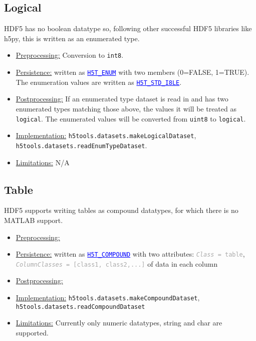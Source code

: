 \documentclass[11pt]{exam}
\newcommand\myurl[1]{\textcolor{blue}{\underline{#1}}}
\newcommand\myfcn[1]{\colorbox{codegray}{\textcolor{codeblue}{\texttt{#1}}}}
\newcommand\hdftype[1]{\texttt{\myurl{#1}}}
\newcommand\myatt[2]{\textcolor{darkgray}{\texttt{\textit{#1} = #2}}}
\begin{document}
		\subsection{Logical}
		\noindent HDF5 has no boolean datatype so, following other successful HDF5 libraries like h5py, this is written as an enumerated type.
		\begin{itemize}
			\item \underline{Preprocessing:} Conversion to \texttt{int8}.
			\item \underline{Persistence:} written as \myurl{\texttt{H5T\_ENUM}} with two members (0=FALSE, 1=TRUE). The enumeration values are written as \hdftype{H5T\_STD\_I8LE}.
			\item \underline{Postprocessing:} If an enumerated type dataset is read in and has two enumerated types matching those above, the values it will be treated as \texttt{logical}. The enumerated values will be converted from \texttt{uint8} to \texttt{logical}. 
			\item \underline{Implementation:} \myfcn{h5tools.datasets.makeLogicalDataset}, \myfcn{h5tools.datasets.readEnumTypeDataset}.
			\item \underline{Limitations:} N/A
		\end{itemize}
		
		\subsection{Table}
		\noindent HDF5 supports writing tables as compound datatypes, for which there is no MATLAB support.
		\begin{itemize}
			\item \underline{Preprocessing:} 
			\item \underline{Persistence:} written as \myurl{\texttt{H5T\_COMPOUND}} with two attributes: \myatt{Class}{table}, \myatt{ColumnClasses}{[class1, class2,...]} of data in each column
			\item \underline{Postprocessing:} 
			\item \underline{Implementation:} \myfcn{h5tools.datasets.makeCompoundDataset}, \\\myfcn{h5tools.datasets.readCompoundDataset}
			\item \underline{Limitations:} Currently only numeric datatypes, string and char are supported.
		\end{itemize}
		
\end{document}
